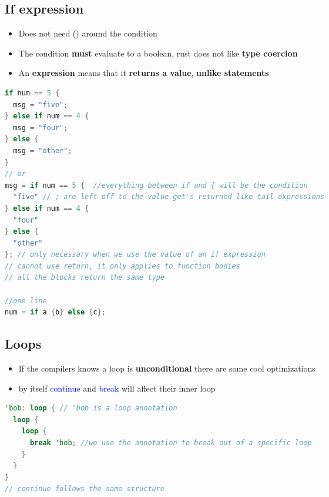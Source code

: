 \documentclass{report}
\begin{document}
\begin{multicols*}{2}
\subsection{If expression}%
\label{sub:If expression}

\begin{itemize}
  \item Does not need () around the condition
  \item The condition \textbf{must} evaluate to a boolean, rust does not like \textbf{type coercion} 
  \item An \textbf{expression} means that it \textbf{returns a value}, \textbf{unlike statements} 
\end{itemize}

\begin{tcolorbox}[title=If,colback=backcolour,size=small,left=4mm]
\begin{lstlisting}[language=rust]
if num == 5 {  
  msg = "five";
} else if num == 4 {
  msg = "four";
} else {
  msg = "other";
}
// or
msg = if num == 5 {  //everything between if and { will be the condition
  "five" // ; are left off to the value get's returned like tail expressions
} else if num == 4 {
  "four"
} else {
  "other"
}; // only necessary when we use the value of an if expression
// cannot use return, it only applies to function bodies
// all the blocks return the same type

//one line
num = if a {b} else {c};
\end{lstlisting}
\end{tcolorbox}

\subsection{Loops}%
\label{sub:Loops}

\begin{itemize}
  \item If the compilers knows a loop is \textbf{unconditional} there are some cool optimizations 
  \item by itself \textcolor{blue}{continue} and \textcolor{blue}{break} will affect their inner loop
\end{itemize}

\begin{tcolorbox}[title=Unconditional Loop,colback=backcolour,size=small,left=4mm]
\begin{lstlisting}[language=rust]
'bob: loop { // 'bob is a loop annotation
  loop {
    loop {
      break 'bob; //we use the annotation to break out of a specific loop
    }
  }
}
// continue follows the same structure
\end{lstlisting}
\end{tcolorbox}


\end{multicols*}
\end{document}
